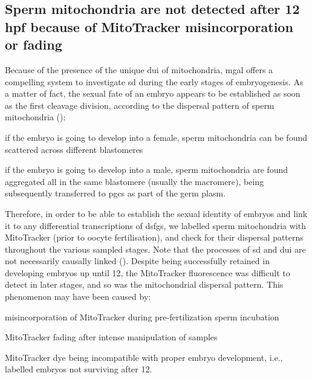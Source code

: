 \subsection{Sperm mitochondria are not detected after 12 hpf because of MitoTracker misincorporation or fading}\label{chapter:insitu-discussionMito}
Because of the presence of the unique \gls{dui} of mitochondria, \gls{mgal} offers a compelling system to investigate \gls{sd} during the early stages of embryogenesis. As a matter of fact, the sexual fate of an embryo appears to be established as soon as the first cleavage division, according to the dispersal pattern of sperm mitochondria ():
\begin{inlinelist}[itemjoin={{; }}]
	\item if the embryo is going to develop into a female, sperm mitochondria can be found scattered across different blastomeres
	\item if the embryo is going to develop into a male, sperm mitochondria are found aggregated all in the same blastomere (usually the macromere), being subsequently transferred to \glspl{pgc} as part of the germ plasm.
\end{inlinelist}
Therefore, in order to be able to establish the sexual identity of embryos and link it to any differential transcriptions of \glspl{dsfg}, we labelled sperm mitochondria with MitoTracker (prior to oocyte fertilisation), and check for their dispersal patterns throughout the various sampled stages. Note that the processes of \gls{sd} and \gls{dui} are not necessarily causally linked (). Despite being successfully retained in developing embryos up until \qty{12}{\hpf}, the MitoTracker fluorescence was difficult to detect in later stages, and so was the mitochondrial dispersal pattern. This phenomenon may have been caused by:
\begin{inlinelist}[itemjoin={{; }}]
	\item misincorporation of MitoTracker during pre-fertilization sperm incubation
	\item MitoTracker fading after intense manipulation of samples
	\item MitoTracker dye being incompatible with proper embryo development, i.e., labelled embryos not surviving after \qty{12}{\hpf}.
\end{inlinelist}
